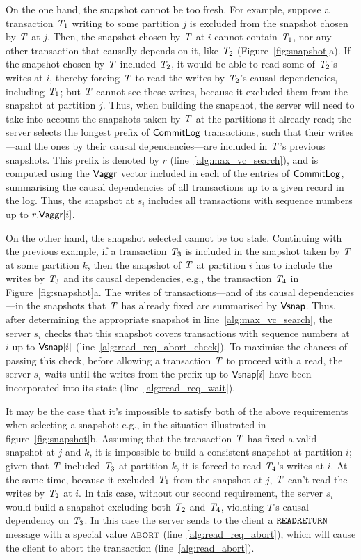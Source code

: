 On the one hand, the snapshot cannot be too fresh. For example, suppose a transaction $\mathit{T}_1$ writing to some partition $j$ is excluded from the snapshot chosen by $\mathit{T}$ at $j$. Then, the snapshot chosen by $\mathit{T}$ at $i$ cannot contain $\mathit{T}_1$, nor any other transaction that causally depends on it, like $\mathit{T}_2$ (Figure~\ref{fig:snapshot}a). If the snapshot chosen by $\mathit{T}$ included $\mathit{T}_2$, it would be able to read some of $\mathit{T}_2$'s writes at $i$, thereby forcing $\mathit{T}$ to read the writes by $\mathit{T}_2$'s causal dependencies, including $\mathit{T}_1$; but $\mathit{T}$ cannot see these writes, because it excluded them from the snapshot at partition $j$. Thus, when building the snapshot, the server will need to take into account the snapshots taken by $\mathit{T}$ at the partitions it already read; the server selects the longest prefix of $\mathsf{CommitLog}$ transactions, such that their writes---and the ones by their causal dependencies---are included in $\mathit{T}$'s previous snapshots. This prefix is denoted by $r$ (line~\ref{alg:max_vc_search}), and is computed using the $\mathsf{Vaggr}$ vector included in each of the entries of $\mathsf{CommitLog}$, summarising the causal dependencies of all transactions up to a given record in the log. Thus, the snapshot at $s_i$ includes all transactions with sequence numbers up to $r.\mathsf{Vaggr}[i]$.

On the other hand, the snapshot selected cannot be too stale. Continuing with the previous example, if a transaction $\mathit{T}_3$ is included in the snapshot taken by $\mathit{T}$ at some partition $k$, then the snapshot of $\mathit{T}$ at partition $i$ has to include the writes by $\mathit{T}_3$ and its causal dependencies, e.g., the transaction $\mathit{T}_4$ in Figure~\ref{fig:snapshot}a. The writes of transactions---and of its causal dependencies---in the snapshots that $\mathit{T}$ has already fixed are summarised by $\mathsf{Vsnap}$. Thus, after determining the appropriate snapshot in line~\ref{alg:max_vc_search}, the server $s_i$ checks that this snapshot covers transactions with sequence numbers at $i$ up to $\mathsf{Vsnap}[i]$ (line~\ref{alg:read_req_abort_check}). To maximise the chances of passing this check, before allowing a transaction $\mathit{T}$ to proceed with a read, the server $s_i$ waits until the writes from the prefix up to $\mathsf{Vsnap}[i]$ have been incorporated into its state (line~\ref{alg:read_req_wait}).

It may be the case that it's impossible to satisfy both of the above requirements when selecting a snapshot; e.g., in the situation illustrated in figure~\ref{fig:snapshot}b. Assuming that the transaction $\mathit{T}$ has fixed a valid snapshot at $j$ and $k$, it is impossible to build a consistent snapshot at partition $i$; given that $\mathit{T}$ included $\mathit{T}_3$ at partition $k$, it is forced to read $\mathit{T}_4$'s writes at $i$. At the same time, because it excluded $\mathit{T}_1$ from the snapshot at $j$, $\mathit{T}$ can't read the writes by $\mathit{T}_2$ at $i$. In this case, without our second requirement, the server $s_i$ would build a snapshot excluding both $\mathit{T}_2$ and $\mathit{T}_4$, violating $T$'s causal dependency on $\mathit{T}_3$. In this case the server sends to the client a ${\tt READRETURN}$ message with a special value $\text{\sc abort}$ (line~\ref{alg:read_req_abort}), which will cause the client to abort the transaction (line~\ref{alg:read_abort}).

